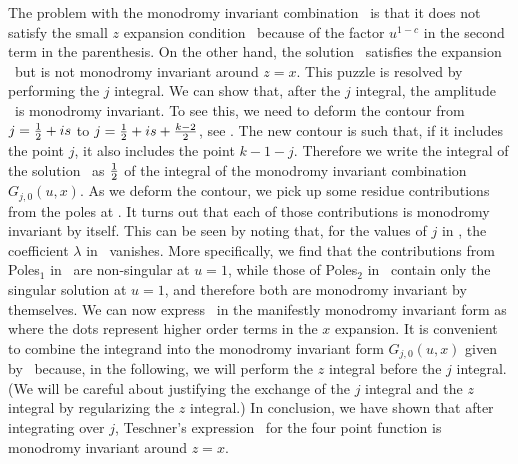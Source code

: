 The problem with the monodromy invariant combination
\monodinv\ is that it does not satisfy the small $z$ expansion condition
\smallz\
because of the factor $u^{1-c}$
in the second term in the parenthesis.
On the other hand, the solution \hypsol\ satisfies the expansion
\smallz\
but is not monodromy invariant around $z=x$.
This puzzle  is resolved by performing the $j$ integral.
We can show that, after the $j$ integral, the amplitude \expres\
is monodromy invariant.
To see this, we need to deform the contour from $j={1\over 2} + is$
to $j={1\over 2} + is + {k-2\over 2}$, see \polesthree .
  The new contour is
such that, if it includes the point  $j$, it also includes
 the point $ k-1-j$.
Therefore we write the integral of the solution \hypsol\
as ${1\over 2}$ of the integral of the
monodromy invariant combination $G_{j,0}(u,x)$.
As we deform the contour, we pick up some residue contributions from
the poles at  \poles . It turns out that
each of those contributions is  monodromy
invariant by itself.
This can be seen by noting that, for the values of $j$  in \poles ,
the coefficient $\lambda$ in \monodinv\ vanishes.
More specifically, we find that the contributions from Poles$_1$ in \poles\
are non-singular at $u=1$,
while those of Poles$_2$ in \poles\ contain only the singular
solution at $u=1$, and therefore both are monodromy invariant
by themselves.
We can now express \expres\ in the manifestly
monodromy invariant form as
\eqn{}
where the dots represent  higher order terms
in the $x$ expansion. It is convenient to combine
the integrand into the monodromy invariant form
$G_{j,0}(u,x)$ given by \monodinv\ because, in the following,
 we will perform the $z$ integral
before the $j$ integral. (We will
be careful about justifying the exchange of the
$j$ integral and the $z$ integral by regularizing
the $z$ integral.)
 In conclusion, we have shown that
after integrating over $j$,  Teschner's expression \expres\
for the four point function is monodromy
invariant around $z=x$.

